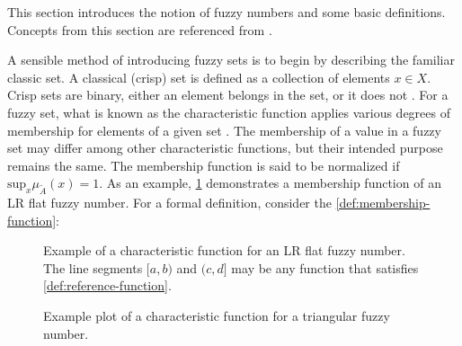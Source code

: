 \documentclass[ee,thesis]{usuthesis}
\begin{document}
\label{sec:fuzzy-set-theory}
This section introduces the notion of fuzzy numbers and some basic definitions. Concepts from this section are
referenced from
\cite{zimmermann-2001-fuzzy-set,das-2016-mathem-model,yaghobi-2014-compar-fuzzy,bello-2019-fuzzy-activ,kaur-2016-introd-fuzzy}.

\label{sec:fuzzy-sets}
A sensible method of introducing fuzzy sets is to begin by describing the familiar classic set. A classical (crisp) set
is defined as a collection of elements \(x \in X\). Crisp sets are binary, either an element belongs in the set, or it does
not \cite{zimmermann-2001-fuzzy-set}. For a fuzzy set, what is known as the characteristic function applies various
degrees of membership for elements of a given set \cite{zimmermann-2001-fuzzy-set}. The membership of a value in a
fuzzy set may differ among other characteristic functions, but their intended purpose remains the same. The
membership function is said to be normalized if \(\text{sup}_x \mu_{\tilde{A}}(x) = 1\). As an example,
\ref{fig:lr-fuzzy-characteristic} demonstrates a membership function of an LR flat fuzzy number. For a formal definition, consider
the \ref{def:membership-function}:

\begin{subfigures}
    \begin{figure}[htpb]
    \centering
        
        \caption{Example of a characteristic function for an LR flat fuzzy number. The line segments $[a,b)$ and $(c,d]$
          may be any function that satisfies \ref{def:reference-function}.}
        \label{fig:lr-fuzzy-characteristic}
    \end{figure}
    \hfill

    \begin{figure}[htpb]
    \centering
        
        \caption{Example plot of a characteristic function for a triangular fuzzy number.}
        \label{fig:triang-characteristic}
    \end{figure}
\end{subfigures}
\end{document}
